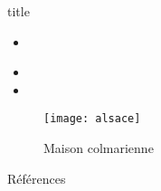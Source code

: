 


\frame[plain]{\titlepage} 
	
\begin{frame}{title}
\begin{itemize}
	\item {}\cite{Feynman1941}
	\item {}
	\item {}
\end{itemize}
\end{frame}

\begin{frame}{}
\begin{figure}[htbp]
\centering
\texttt{[image: alsace]}
\caption{Maison colmarienne}
\end{figure}
\end{frame}

\begin{frame}{Références}
\printbibliography
\end{frame}
